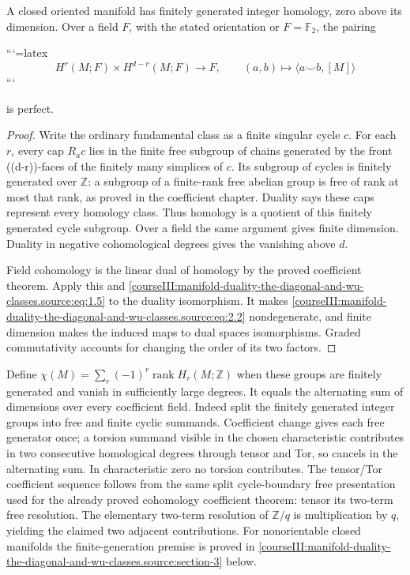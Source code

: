 \label{courseIII:duality:2.3}

\begin{corollary}
A closed oriented manifold has finitely generated integer homology, zero above its dimension. Over a field \(F\), with the stated orientation or \(F=\mathbb F _2\), the pairing


```{=latex}
\begin{equation}
H^r(M;F)\times H^{d-r}(M;F)\to F,
\qquad (a,b)\mapsto\langle a\smile b,[M]\rangle
\label{courseIII:manifold-duality-the-diagonal-and-wu-classes.source:eq:2.2}
\end{equation}
```


is perfect.
\end{corollary}
\begin{proof}
Write the ordinary fundamental class as a finite singular cycle \(c\). For each \(r\), every cap \(R_a c\) lies in the finite free subgroup of chains generated by the front ((d-r))-faces of the finitely many simplices of \(c\). Its subgroup of cycles is finitely generated over \(\mathbb Z\): a subgroup of a finite-rank free abelian group is free of rank at most that rank, as proved in the coefficient chapter. Duality says these caps represent every homology class. Thus homology is a quotient of this finitely generated cycle subgroup. Over a field the same argument gives finite dimension. Duality in negative cohomological degrees gives the vanishing above \(d\).

Field cohomology is the linear dual of homology by the proved coefficient theorem. Apply this and \eqref{courseIII:manifold-duality-the-diagonal-and-wu-classes.source:eq:1.5} to the duality isomorphism. It makes \eqref{courseIII:manifold-duality-the-diagonal-and-wu-classes.source:eq:2.2} nondegenerate, and finite dimension makes the induced maps to dual spaces isomorphisms. Graded commutativity accounts for changing the order of its two factors.
\end{proof}

Define \(\chi(M)=\sum_r(-1)^r\operatorname{rank}H_r(M;\mathbb Z)\) when these groups are finitely generated and vanish in sufficiently large degrees. It equals the alternating sum of dimensions over every coefficient field. Indeed split the finitely generated integer groups into free and finite cyclic summands. Coefficient change gives each free generator once; a torsion summand visible in the chosen characteristic contributes in two consecutive homological degrees through tensor and Tor, so cancels in the alternating sum. In characteristic zero no torsion contributes. The tensor/Tor coefficient sequence follows from the same split cycle-boundary free presentation used for the already proved cohomology coefficient theorem: tensor its two-term free resolution. The elementary two-term resolution of \(\mathbb Z/q\) is multiplication by \(q\), yielding the claimed two adjacent contributions. For nonorientable closed manifolds the finite-generation premise is proved in \cref{courseIII:manifold-duality-the-diagonal-and-wu-classes.source:section-3} below.

